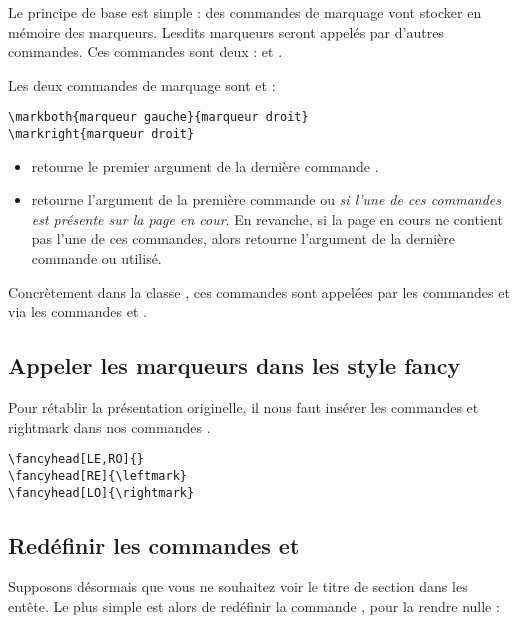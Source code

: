 {Le principe de base est simple : des commandes de marquage vont stocker en mémoire des marqueurs. Lesdits marqueurs seront appelés par d'autres commandes. Ces commandes sont  deux :  et .

Les deux commandes de marquage sont  et  :

\begin{verbatim}
\markboth{marqueur gauche}{marqueur droit}
\markright{marqueur droit}
\end{verbatim}

\begin{itemize}
\item {} retourne le premier argument de la dernière commande .
\item {} retourne l'argument  de la première commande  ou  \emph{si l'une de ces commandes est présente sur la page en cour}. En revanche, si la page en cours ne contient pas l'une de ces commandes, alors  retourne l'argument  de la dernière commande  ou  utilisé.
\end{itemize}

Concrètement dans la classe , ces commandes sont appelées par les commandes  et  via les commandes  et . 

\subsection{Appeler les marqueurs dans les style fancy}

Pour rétablir la présentation originelle, il nous faut insérer les commandes  et {rightmark} dans nos commandes .

\begin{verbatim}
\fancyhead[LE,RO]{}
\fancyhead[RE]{\leftmark}
\fancyhead[LO]{\rightmark}
\end{verbatim}

\subsection{Redéfinir les commandes  et }

Supposons désormais que vous ne souhaitez voir le titre de section dans les entête. Le plus simple est alors de redéfinir la commande , pour la rendre nulle :

}
